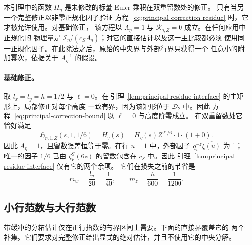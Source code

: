 \documentclass[11pt,a4paper]{article}
\numberwithin{equation}{section}
\numberwithin{figure}{section}
\theoremstyle{definition}
\theoremstyle{remark}
\begin{document}
本引理中的函数 $H_\eta$ 是未修改的标量 Euler 乘积在双重留数处的修正。
只有当另一个完整修正以非零正规化因子验证
方程~\eqref{eq:principal-correction-residue} 时，它才被允许使用。对基础修正，
该方程以 $A_\eta=1$ 与 $\mathcal R_{\eta,Z}=0$ 成立。在任何应用中正规化的
物理量是 $\mathscr I_\eta/(c_SA_\eta)$；对它的直接估计以及这一主比较都必须
使用同一正规化因子。在此除法之后，原始的中央界与外部行界只获得一个
任意小的附加幂次，依据关于 $A_\eta^{-1}$ 的假设。

\paragraph{基础修正。}

取 $l_x=l_y=h=1/2$ 与 $\ell=0$。在
引理~\ref{lem:principal-residue-interface} 的主矩形上，局部修正对每个高度
一致有界，因为该矩形位于 $\mathcal D_2$ 中。因此
方程~\eqref{eq:principal-correction-bound} 以 $\ell=0$ 与高度阶零成立。
在双重留数处它恰好满足
\[
 \mathfrak H_{\eta,1,Z}(s,1,1/6)=H_\eta(s)
       =H_\eta(s)Z^{\ell/6}\cdot1\cdot(1+0).
\]
因此 $A_\eta=1$，且留数误差恒等于零。在行 $u=1$ 中，外部因子
$q_u^{-z}\overline{\xi(u)}$ 为 1；唯一的因子 $1/6$ 已由
$\zeta_F^S(6z)$ 的留数包含在 $c_S$ 中。因此
引理~\ref{lem:principal-residue-interface} 仅有它的两个余项。
它们在损失之前的节省是
\[
 m_w=\frac{l_y}{20}=\frac1{40},\qquad
 m_z=\frac h{600}=\frac1{1200}.
\]

\subsection{小行范数与大行范数}

带缓冲的分箱估计仅在正行指数的有界区间上需要。下面的直接界覆盖它的
两个补集。它们要求对完整修正给出显式的绝对估计，并且不使用它的中央分解。
\end{document}
